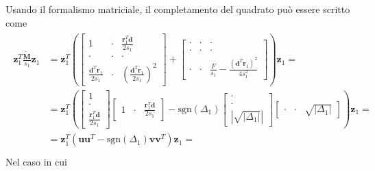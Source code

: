 \documentclass[letterpaper,10pt,italian]{jupyterBook}
\begin{document}
\sphinxAtStartPar
Usando il formalismo matriciale, il completamento del quadrato può essere scritto come
\begin{equation*}
\begin{split}\begin{aligned}
  \mathbf{z}_1^T \frac{\widetilde{\mathbf{M}}}{s_1} \mathbf{z}_1 
  & = \mathbf{z}_1^T \left( \begin{bmatrix} 1 & \cdot & \frac{\mathbf{r}_1^T \mathbf{d}}{2 s_1} \\ \cdot & \cdot & \cdot \\ \frac{\mathbf{d}^T \mathbf{r}_1}{2 s_1} & \cdot & \left( \frac{\mathbf{d}^T \mathbf{r}_1}{2 s_1} \right)^2 \end{bmatrix} + \begin{bmatrix} \cdot & \cdot & \cdot \\ \cdot & \cdot & \cdot \\ \cdot & \cdot & \frac{F}{s_1} - \frac{\left(\mathbf{d}^T\mathbf{r}_1\right)^2}{4 s_1^2} \end{bmatrix} \right) \mathbf{z}_1 = \\
  & = \mathbf{z}_1^T \left( \begin{bmatrix} 1 \\ \cdot \\ \frac{\mathbf{r}_1^T \mathbf{d}}{2 s_1} \end{bmatrix} \begin{bmatrix} 1 & \cdot & \frac{\mathbf{r}_1^T \mathbf{d}}{2 s_1} \end{bmatrix} - \text{sgn}(\Delta_1) \begin{bmatrix} \cdot \\ \cdot \\ |\sqrt{|\Delta_1|}| \end{bmatrix} \begin{bmatrix} \cdot & \cdot & \sqrt{|\Delta_1|} \end{bmatrix} \right) \mathbf{z}_1 = \\
  & = \mathbf{z}_1^T \left( \mathbf{u} \mathbf{u}^T - \text{sgn}(\Delta_1) \mathbf{v} \mathbf{v}^T \right) \mathbf{z}_1 = \\
\end{aligned}\end{split}
\end{equation*}
\sphinxAtStartPar
Nel caso in cui
\end{document}
